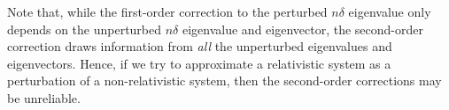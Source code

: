 \br
Note that, while the first-order correction to the perturbed $n\delta$ eigenvalue only depends on the unperturbed $n\delta$ eigenvalue and eigenvector, the second-order correction draws information from \emph{all} the unperturbed eigenvalues and eigenvectors. Hence, if we try to approximate a relativistic system as a perturbation of a non-relativistic system, then the second-order corrections may be unreliable.
\er

























